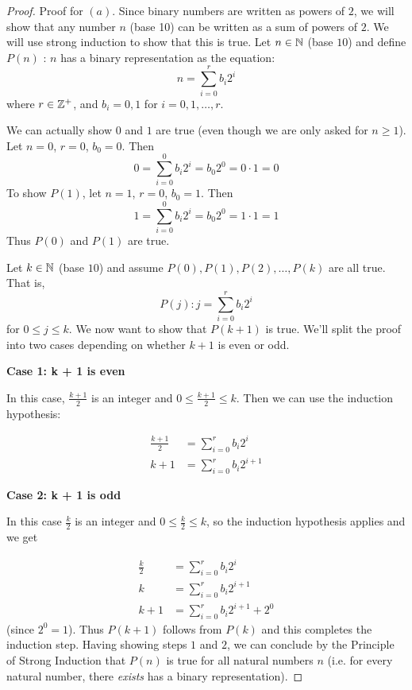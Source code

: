 \documentclass[12pt, a4paper]{amsart}
\theoremstyle{definition}
\theoremstyle{remark}
\numberwithin{Theorem}{section}
\begin{document}
\begin{proof}
    Proof for $(a)$. Since binary numbers are written as powers of $2$,
    we will show that any number $n$ (base 10) can be written as a sum
    of powers of $2$. We will use strong induction to show that this is true.
    Let $n \in \mathbb N$ (base $10$) and define 
    $P(n)$ : $n$ has a binary representation as the equation:
    $$n = \sum_{i = 0}^{r}b_i 2^i$$
    where $r \in \mathbb Z^+$, and $b_i = 0, 1$ for $i = 0, 1, \dots, r$.
    
    \base
    
    We can actually show $0$ and $1$ are true (even though we are only 
    asked for $n \geqslant 1$).
    Let $n = 0$, $r = 0$, $b_0 = 0$. Then
    $$0 = \sum_{i = 0}^{0}b_i 2^i = b_0 2^0 = 0 \cdot 1 = 0$$
    To show $P(1)$, let $n = 1$, $r = 0$, $b_0 = 1$. Then
    $$1 = \sum_{i = 0}^{0}b_i 2^i = b_0 2^0 = 1 \cdot 1 = 1$$
    Thus $P(0)$ and $P(1)$ are true.
    
    \istep
    
    Let $k \in \mathbb N$ (base $10$) and assume $P(0), P(1), P(2), \dots, P(k)$
    are all true. That is,
    $$P(j): j = \sum_{i = 0}^{r}b_i 2^i$$
    for $0 \leqslant j \leqslant k$. We now want to show that $P(k + 1)$
    is true. We'll split the proof into two cases depending on 
    whether $k + 1$ is even or odd.
    
    \textbf{Case 1: k + 1 is even}
    
    In this case, $\frac{k + 1}{2}$ is an integer and 
    $0 \leqslant \frac{k + 1}{2} \leqslant k$. Then we can use the
    induction hypothesis:
    
    \begin{align*}
        \frac{k + 1}{2} &= \sum_{i = 0}^{r}b_i 2^i \\
        k + 1 &= \sum_{i = 0}^{r}b_i 2^{i + 1} \tag{multiply both sides by 2}
    \end{align*}
    
    \textbf{Case 2: k + 1 is odd}
    
    In this case $\frac{k}{2}$ is an integer and 
    $0 \leqslant \frac{k}{2} \leqslant k$, so the induction hypothesis
    applies and we get
    
    \begin{align*}
        \frac{k}{2} &= \sum_{i = 0}^{r}b_i 2^i \\
        k &= \sum_{i = 0}^{r}b_i 2^{i + 1} \\
        k + 1 &= \sum_{i = 0}^{r}b_i 2^{i + 1} + 2^0
    \end{align*}
    (since $2^0 = 1$). Thus $P(k + 1)$ follows from $P(k)$ and this
    completes the induction step. Having showing steps $1$ and $2$,
    we can conclude by the Principle of Strong Induction that
    $P(n)$ is true for all natural numbers $n$ (i.e. for every natural
    number, there \emph{exists} has a binary representation).
    
\end{proof}
\end{document}
